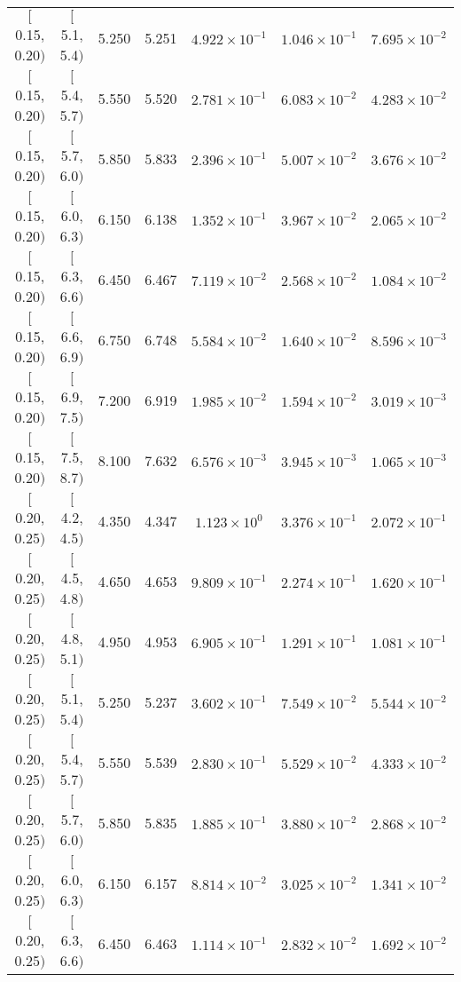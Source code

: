 \begin{longtable}{| c | c | c | c | c | c | c |}
$[$0.15, 0.20$)$ & $[$5.1, 5.4$)$ & 5.250 & 5.251 & $4.922 \times 10^{-1}$ & $1.046 \times 10^{-1}$ & $7.695 \times 10^{-2}$ \\
$[$0.15, 0.20$)$ & $[$5.4, 5.7$)$ & 5.550 & 5.520 & $2.781 \times 10^{-1}$ & $6.083 \times 10^{-2}$ & $4.283 \times 10^{-2}$ \\
$[$0.15, 0.20$)$ & $[$5.7, 6.0$)$ & 5.850 & 5.833 & $2.396 \times 10^{-1}$ & $5.007 \times 10^{-2}$ & $3.676 \times 10^{-2}$ \\
$[$0.15, 0.20$)$ & $[$6.0, 6.3$)$ & 6.150 & 6.138 & $1.352 \times 10^{-1}$ & $3.967 \times 10^{-2}$ & $2.065 \times 10^{-2}$ \\
$[$0.15, 0.20$)$ & $[$6.3, 6.6$)$ & 6.450 & 6.467 & $7.119 \times 10^{-2}$ & $2.568 \times 10^{-2}$ & $1.084 \times 10^{-2}$ \\
$[$0.15, 0.20$)$ & $[$6.6, 6.9$)$ & 6.750 & 6.748 & $5.584 \times 10^{-2}$ & $1.640 \times 10^{-2}$ & $8.596 \times 10^{-3}$ \\
$[$0.15, 0.20$)$ & $[$6.9, 7.5$)$ & 7.200 & 6.919 & $1.985 \times 10^{-2}$ & $1.594 \times 10^{-2}$ & $3.019 \times 10^{-3}$ \\
$[$0.15, 0.20$)$ & $[$7.5, 8.7$)$ & 8.100 & 7.632 & $6.576 \times 10^{-3}$ & $3.945 \times 10^{-3}$ & $1.065 \times 10^{-3}$ \\
\hline
$[$0.20, 0.25$)$ & $[$4.2, 4.5$)$ & 4.350 & 4.347 & $1.123 \times 10^{0}$ & $3.376 \times 10^{-1}$ & $2.072 \times 10^{-1}$ \\
$[$0.20, 0.25$)$ & $[$4.5, 4.8$)$ & 4.650 & 4.653 & $9.809 \times 10^{-1}$ & $2.274 \times 10^{-1}$ & $1.620 \times 10^{-1}$ \\
$[$0.20, 0.25$)$ & $[$4.8, 5.1$)$ & 4.950 & 4.953 & $6.905 \times 10^{-1}$ & $1.291 \times 10^{-1}$ & $1.081 \times 10^{-1}$ \\
$[$0.20, 0.25$)$ & $[$5.1, 5.4$)$ & 5.250 & 5.237 & $3.602 \times 10^{-1}$ & $7.549 \times 10^{-2}$ & $5.544 \times 10^{-2}$ \\
$[$0.20, 0.25$)$ & $[$5.4, 5.7$)$ & 5.550 & 5.539 & $2.830 \times 10^{-1}$ & $5.529 \times 10^{-2}$ & $4.333 \times 10^{-2}$ \\
$[$0.20, 0.25$)$ & $[$5.7, 6.0$)$ & 5.850 & 5.835 & $1.885 \times 10^{-1}$ & $3.880 \times 10^{-2}$ & $2.868 \times 10^{-2}$ \\
$[$0.20, 0.25$)$ & $[$6.0, 6.3$)$ & 6.150 & 6.157 & $8.814 \times 10^{-2}$ & $3.025 \times 10^{-2}$ & $1.341 \times 10^{-2}$ \\
$[$0.20, 0.25$)$ & $[$6.3, 6.6$)$ & 6.450 & 6.463 & $1.114 \times 10^{-1}$ & $2.832 \times 10^{-2}$ & $1.692 \times 10^{-2}$ \\

\end{longtable}
